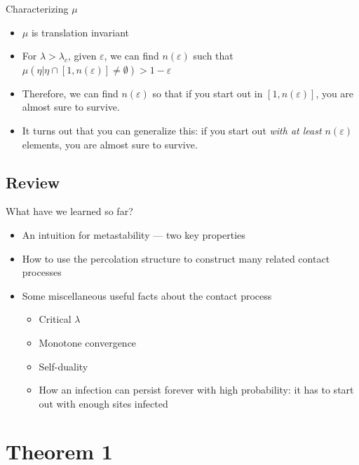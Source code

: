 \documentclass{beamer}
\newcommand{\ep}{\varepsilon}
\begin{document}
\begin{frame}{Characterizing $\mu$}
  \begin{itemize}
    \item $\mu$ is translation invariant
          \pause
    \item For $\lambda > \lambda_{c}$, given $\ep$, we can find $n(\ep)$ such that $\mu(\eta | \eta \cap [1,n(\ep)] \neq \emptyset) > 1 - \ep$
          \pause
    \item Therefore, we can find $n(\ep)$ so that if you start out in $[1,n(\ep)]$, you are almost sure to survive.
          \pause
    \item It turns out that you can generalize this: if you start out \emph{with at least $n(\ep)$} elements, you are almost sure to survive.
  \end{itemize}
\end{frame}

\subsection{Review}

\begin{frame}
  What have we learned so far?
  \begin{itemize}
    \item An intuition for metastability --- two key properties
          \pause
    \item How to use the percolation structure to construct many related contact processes
          \pause
    \item Some miscellaneous useful facts about the contact process
          \pause
          \begin{itemize}
            \item Critical $\lambda$
                  \pause
            \item Monotone convergence
                  \pause
            \item Self-duality
                  \pause
            \item How an infection can persist forever with high probability: it has to start out with enough sites infected
          \end{itemize}
  \end{itemize}
\end{frame}

\section{Theorem 1}
\end{document}
